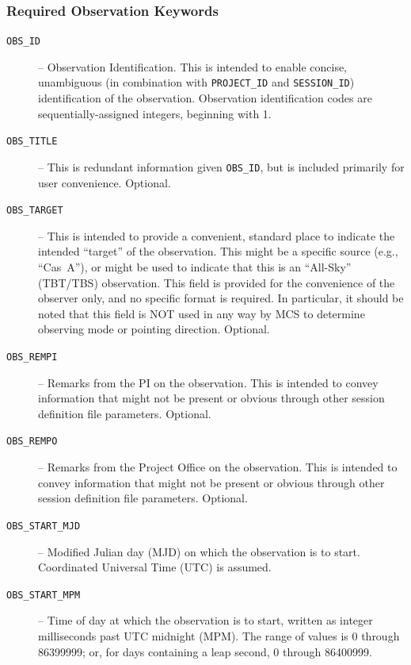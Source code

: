 \subsubsection{Required Observation Keywords}

\begin{description}
\item[\texttt{OBS\_ID}] -- Observation Identification.  This is intended to enable concise, unambiguous (in combination with \texttt{PROJECT\_ID} and \texttt{SESSION\_ID}) identification of the observation.  Observation identification codes are sequentially-assigned integers, beginning with 1.

\item[\texttt{OBS\_TITLE}] -- This is redundant information given \texttt{OBS\_ID}, but is included primarily for user convenience.  Optional.

\item[\texttt{OBS\_TARGET}] -- This is intended to provide a convenient, standard place to indicate the intended ``target'' of the observation.  This might be a specific source (e.g., ``Cas~A''), or might be used to indicate that this is an ``All-Sky'' (TBT/TBS) observation.  This field is provided for the convenience of the observer only, and no specific format is required.  In particular, it should be noted that this field is NOT used in any way by MCS to determine observing mode or pointing direction.  Optional.

\item[\texttt{OBS\_REMPI}] -- Remarks from the PI on the observation.  This is intended to convey information that might not be present or obvious through other session definition file parameters.  Optional.

\item[\texttt{OBS\_REMPO}] -- Remarks from the Project Office on the observation.  This is intended to convey information that might not be present or obvious through other session definition file parameters.  Optional.

\item[\texttt{OBS\_START\_MJD}] -- Modified Julian day (MJD) on which the observation is to start.  Coordinated Universal Time (UTC) is assumed.

\item[\texttt{OBS\_START\_MPM}] -- Time of day at which the observation is to start, written as integer milliseconds past UTC midnight (MPM).  The range of values is 0 through 86399999; or, for days containing a leap second, 0 through 86400999.


\end{description}
